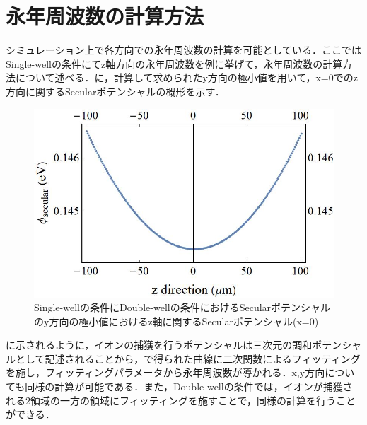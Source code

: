 %
\clearpage
%
\section{永年周波数の計算方法}
シミュレーション上で各方向での永年周波数の計算を可能としている．ここではSingle-wellの条件にてz軸方向の永年周波数を例に挙げて，永年周波数の計算方法について述べる．に，計算して求められたy方向の極小値を用いて，x=0でのz方向に関するSecularポテンシャルの概形を示す．
\begin{figure}[h]
	\begin{center}
		\includegraphics[width = 0.6\linewidth]{./simulation/figure/determine_SecFreq.jpg}
		\caption{Single-wellの条件にDouble-wellの条件におけるSecularポテンシャルのy方向の極小値におけるz軸に関するSecularポテンシャル(x=0)}
		\label{fig:determine_SecFreq}
	\end{center}
\end{figure}

に示されるように，イオンの捕獲を行うポテンシャルは三次元の調和ポテンシャルとして記述されることから，で得られた曲線に二次関数によるフィッティングを施し，フィッティングパラメータから永年周波数が導かれる．x,y方向についても同様の計算が可能である．また，Double-wellの条件では，イオンが捕獲される2領域の一方の領域にフィッティングを施すことで，同様の計算を行うことができる．

